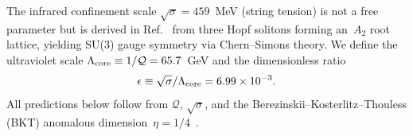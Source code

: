 ﻿\documentclass[aps,prl,twocolumn,superscriptaddress,showpacs]{revtex4-2}
\newcommand{\Qoppa}{\mathcal{Q}} %
\begin{document}
The infrared confinement scale $\sqrt{\sigma} = 459$~MeV (string
tension) is not a free parameter but is derived in Ref.~\cite{PaperII}
from three Hopf solitons forming an~$A_2$ root lattice, yielding
SU(3) gauge symmetry via Chern--Simons theory.
We define the ultraviolet scale $\Lambda_{\rm core} \equiv 1/\Qoppa
= 65.7$~GeV and the dimensionless ratio
\begin{equation}\label{eq:epsilon}
\epsilon \equiv \sqrt{\sigma}/\Lambda_{\rm core} = 6.99 \times 10^{-3}.
\end{equation}
All predictions below follow from $\Qoppa$, $\sqrt{\sigma}$, and
the Berezinskii--Kosterlitz--Thouless (BKT) anomalous
dimension~$\eta = 1/4$~\cite{NK1977}.


\end{document}
